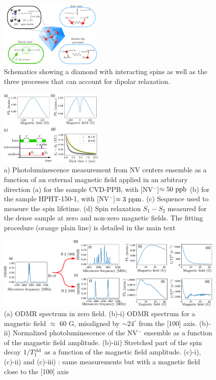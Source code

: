 \documentclass[preprintnumbers,amsmath,amssymb,superscriptaddress,twocolumn,showpacs]{revtex4-2}
\begin{document}
\begin{figure}
\includegraphics[width=0.45\textwidth]{Figures/shema_summary.pdf}
\caption{Schematics showing a diamond with interacting spins as well as the three processes that can account for dipolar relaxation. }
\label{schema_intro}
\end{figure}

\begin{figure}
\includegraphics[width=0.45\textwidth]{Figures/fig_T1.pdf}
\caption{a) Photoluminescence measurement from NV centers ensemble as a function of an external magnetic field applied in an arbitrary direction (a) for the sample CVD-PPB, with [NV$^-$]$\approx 50\ \rm ppb$ (b) for the sample HPHT-150-1, with [NV$^-$]$\approx 3\ \rm ppm$. (c) Sequence used to measure the spin lifetime. (d) Spin relaxation $S_1-S_2$ measured for the dense sample at zero and non-zero magnetic fields. The fitting procedure (orange plain line) is detailed in the main text}
\label{T1}
\end{figure}

\begin{figure}
\includegraphics[width=.95\textwidth]{Figures/fig_100_vs_1x1x1x1.pdf}
\caption{(a) ODMR spectrum in zero field. (b)-i) ODMR spectrum for a magnetic field $\approx$ 60 G, misaligned by $\sim  24^\circ$ from the [100] axis. (b)-ii) Normalized photoluminescence of the NV$^-$ ensemble as a function of the magnetic field amplitude. (b)-iii) Stretched part of the spin decay $1/T_1^{\rm dd}$ as a function of the magnetic field amplitude. (c)-i), (c)-ii) and (c)-iii) : same measurements but with a magnetic field close to the [100] axis}
\label{100_VS_1x4}
\end{figure}
\end{document}
